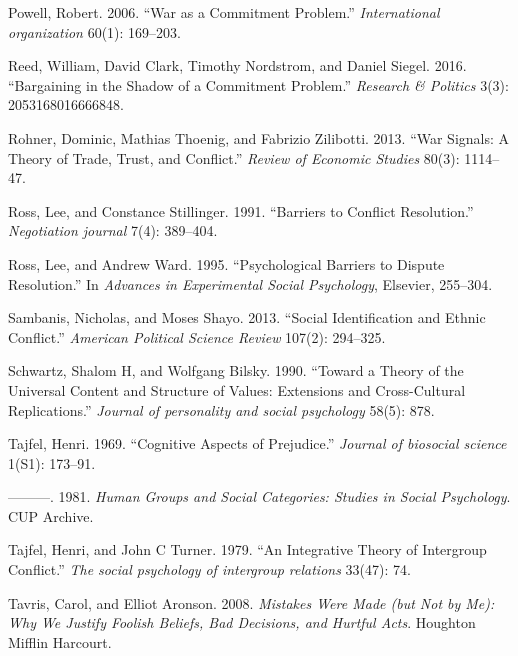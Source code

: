 \documentclass[11pt]{article}
\begin{document}
\leavevmode\hypertarget{ref-powell2006war}{}%
Powell, Robert. 2006. ``War as a Commitment Problem.''
\emph{International organization} 60(1): 169--203.

\leavevmode\hypertarget{ref-reed2016bargaining}{}%
Reed, William, David Clark, Timothy Nordstrom, and Daniel Siegel. 2016.
``Bargaining in the Shadow of a Commitment Problem.'' \emph{Research \&
Politics} 3(3): 2053168016666848.

\leavevmode\hypertarget{ref-rohner2013war}{}%
Rohner, Dominic, Mathias Thoenig, and Fabrizio Zilibotti. 2013. ``War
Signals: A Theory of Trade, Trust, and Conflict.'' \emph{Review of
Economic Studies} 80(3): 1114--47.

\leavevmode\hypertarget{ref-ross1991barriers}{}%
Ross, Lee, and Constance Stillinger. 1991. ``Barriers to Conflict
Resolution.'' \emph{Negotiation journal} 7(4): 389--404.

\leavevmode\hypertarget{ref-ross1995psychological}{}%
Ross, Lee, and Andrew Ward. 1995. ``Psychological Barriers to Dispute
Resolution.'' In \emph{Advances in Experimental Social Psychology},
Elsevier, 255--304.

\leavevmode\hypertarget{ref-sambanis2013social}{}%
Sambanis, Nicholas, and Moses Shayo. 2013. ``Social Identification and
Ethnic Conflict.'' \emph{American Political Science Review} 107(2):
294--325.

\leavevmode\hypertarget{ref-schwartz1990toward}{}%
Schwartz, Shalom H, and Wolfgang Bilsky. 1990. ``Toward a Theory of the
Universal Content and Structure of Values: Extensions and Cross-Cultural
Replications.'' \emph{Journal of personality and social psychology}
58(5): 878.

\leavevmode\hypertarget{ref-tajfel1969cognitive}{}%
Tajfel, Henri. 1969. ``Cognitive Aspects of Prejudice.'' \emph{Journal
of biosocial science} 1(S1): 173--91.

\leavevmode\hypertarget{ref-tajfel1981groups}{}%
---------. 1981. \emph{Human Groups and Social Categories: Studies in
Social Psychology}. CUP Archive.

\leavevmode\hypertarget{ref-tajfel1979integrative}{}%
Tajfel, Henri, and John C Turner. 1979. ``An Integrative Theory of
Intergroup Conflict.'' \emph{The social psychology of intergroup
relations} 33(47): 74.

\leavevmode\hypertarget{ref-tavris2008mistakes}{}%
Tavris, Carol, and Elliot Aronson. 2008. \emph{Mistakes Were Made (but
Not by Me): Why We Justify Foolish Beliefs, Bad Decisions, and Hurtful
Acts}. Houghton Mifflin Harcourt.
\end{document}
